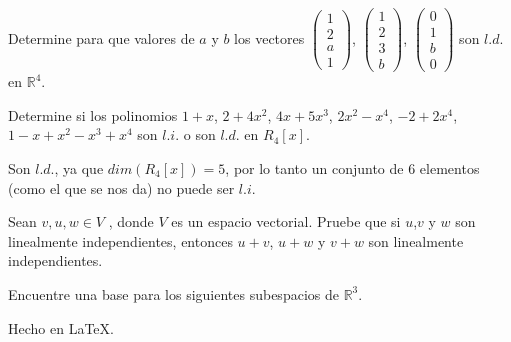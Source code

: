 \documentclass[answers]{exam}
\begin{document}
\begin{questions}

	\question Determine para que valores de $a$ y $b$ los vectores $\begin{pmatrix}1\\2\\a\\1\end{pmatrix}$, $\begin{pmatrix}1\\2\\3\\b\end{pmatrix}$, $\begin{pmatrix}0\\1\\b\\0\end{pmatrix}$ son $l.d.$ en $\mathbb{R}^4$.

	\question Determine si los polinomios $1+x$, $2+4x^2$, $4x+5x^3$, $2x^2-x^4$, $-2+2x^4$, $1-x+x^2-x^3+x^4$ son $l.i.$ o son $l.d.$ en $R_4[x]$.
	\begin{solution}
		Son $l.d.$, ya que $dim(R_4[x])=5$, por lo tanto un conjunto de 6 elementos (como el que se nos da) no puede ser $l.i.$
	\end{solution}

	\question Sean $v,u,w\in V$ , donde $V$ es un espacio vectorial. Pruebe que si $u$,$v$ y $w$ son linealmente independientes, entonces $u+v$, $u+w$ y $v+w$ son linealmente independientes.

	\question Encuentre una base para los siguientes subespacios de $\mathbb{R}^3$.
\end{questions}

\par Hecho en \LaTeX.
\end{document}
